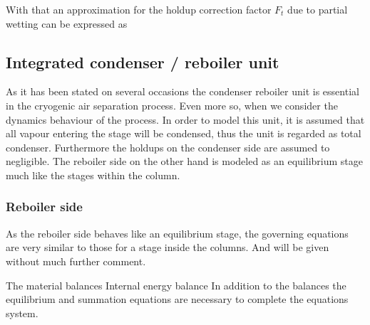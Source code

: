         With that an approximation for the holdup correction factor $F_t$ due to partial wetting can be expressed as

\subsection{Integrated condenser / reboiler unit}

    As it has been stated on several occasions the condenser reboiler unit is essential in the cryogenic air separation process.
    Even more so, when we consider the dynamics behaviour of the process. In order to model this unit, it is assumed that
    all vapour entering the stage will be condensed, thus the unit is regarded as total condenser. Furthermore the holdups on the
    condenser side are assumed to negligible. The reboiler side on the other hand is modeled as an equilibrium stage much like
    the stages within the column.

    \subsubsection{Reboiler side}
        As the reboiler side behaves like an equilibrium stage, the governing equations are very similar to those for
        a stage inside the columns. And will be given without much further comment.

        The material balances
        Internal energy balance
        In addition to the balances the equilibrium and summation equations are necessary to complete
        the equations system.

